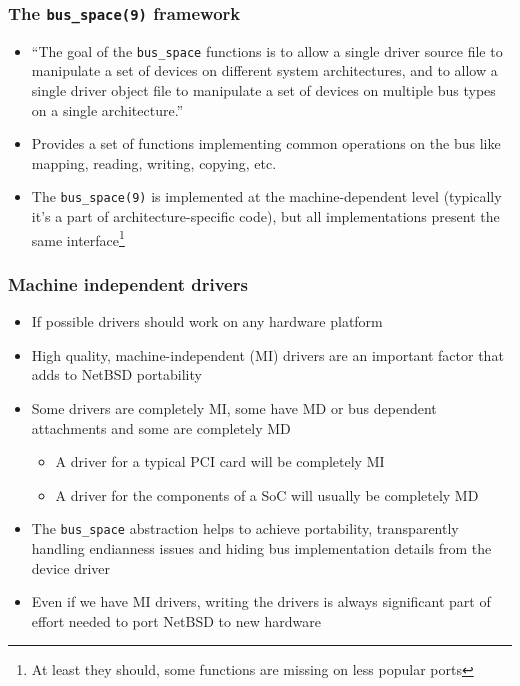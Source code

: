 \documentclass[dvipsnames,table]{beamer}
\begin{document}
\begin{frame}
\frametitle{The {\tt bus\_space(9)} framework}
\begin{itemize}
	\item ``The goal of the {\tt bus\_space} functions is to allow a single
     driver source file to manipulate a set of devices on different system
     architectures, and to allow a single driver object file to manipulate a
     set of devices on multiple bus types on a single architecture.''
     \item Provides a set of functions implementing common operations on the bus like mapping, reading, writing, copying, etc.
     \item The {\tt bus\_space(9)} is implemented at the machine-dependent level (typically it's a part of architecture-specific code), but all implementations present the same interface\footnote{At least they should, some functions are missing on less popular ports}
\end{itemize}
\end{frame}

\begin{frame}
\frametitle{Machine independent drivers}

\begin{itemize}
	\item If possible drivers should work on any hardware platform
	\item High quality, machine-independent (MI) drivers are an important factor that adds to NetBSD portability
	\item Some drivers are completely MI, some have MD or bus dependent attachments and some are completely MD
	\begin{itemize}
		\item A driver for a typical PCI card will be completely MI
		\item A driver for the components of a SoC will usually be completely MD
	\end{itemize}
	\item The {\tt bus\_space} abstraction helps to achieve portability, transparently handling endianness issues and hiding bus implementation details from the device driver
	\item Even if we have MI drivers, writing the drivers is always significant part of effort needed to port NetBSD to new hardware
\end{itemize}
\end{frame}

\end{document}
